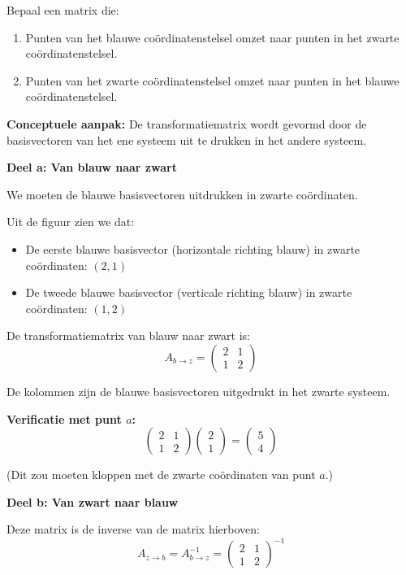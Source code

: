 \documentclass{ximera}
\begin{document}
\begin{problem}
Bepaal een matrix die:
\begin{enumerate}
\item Punten van het blauwe coördinatenstelsel omzet naar punten in het zwarte coördinatenstelsel.
\item Punten van het zwarte coördinatenstelsel omzet naar punten in het blauwe coördinatenstelsel.
\end{enumerate}
\end{problem}

\begin{freeResponse}
\textbf{Conceptuele aanpak:} De transformatiematrix wordt gevormd door de basisvectoren van het ene systeem uit te drukken in het andere systeem.

\textbf{Deel a: Van blauw naar zwart}

We moeten de blauwe basisvectoren uitdrukken in zwarte coördinaten.

Uit de figuur zien we dat:
\begin{itemize}
\item De eerste blauwe basisvector (horizontale richting blauw) in zwarte coördinaten: $(2, 1)$
\item De tweede blauwe basisvector (verticale richting blauw) in zwarte coördinaten: $(1, 2)$
\end{itemize}

De transformatiematrix van blauw naar zwart is:
$$A_{b \to z} = \begin{pmatrix} 2 & 1 \\ 1 & 2 \end{pmatrix}$$

De kolommen zijn de blauwe basisvectoren uitgedrukt in het zwarte systeem.

\textbf{Verificatie met punt $a$:}
$$\begin{pmatrix} 2 & 1 \\ 1 & 2 \end{pmatrix} \begin{pmatrix} 2 \\ 1 \end{pmatrix} = \begin{pmatrix} 5 \\ 4 \end{pmatrix}$$

(Dit zou moeten kloppen met de zwarte coördinaten van punt $a$.)

\textbf{Deel b: Van zwart naar blauw}

Deze matrix is de inverse van de matrix hierboven:
$$A_{z \to b} = A_{b \to z}^{-1} = \begin{pmatrix} 2 & 1 \\ 1 & 2 \end{pmatrix}^{-1}$$


\end{freeResponse}
\end{document}
